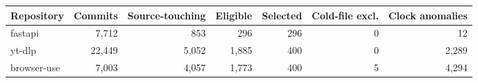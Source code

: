\begin{tabular}{lrrrrrr}
\toprule
Repository & Commits & Source-touching & Eligible & Selected & Cold-file excl. & Clock anomalies \\
\midrule
fastapi & 7,712 & 853 & 296 & 296 & 0 & 12 \\
yt-dlp & 22,449 & 5,052 & 1,885 & 400 & 0 & 2,289 \\
browser-use & 7,003 & 4,057 & 1,773 & 400 & 5 & 4,294 \\
\bottomrule
\end{tabular}